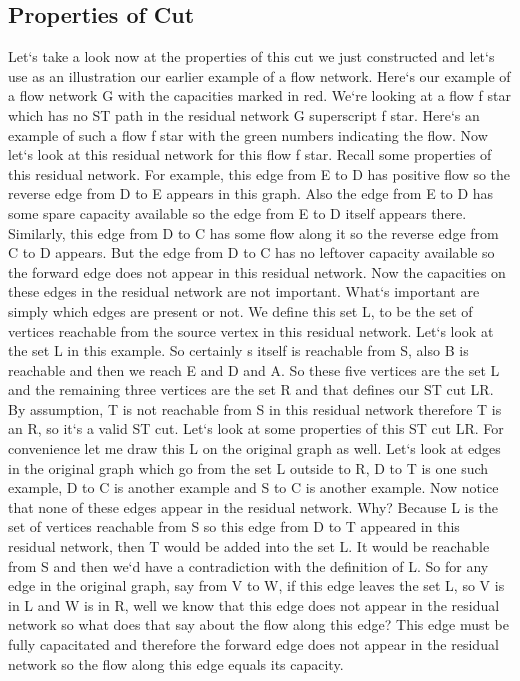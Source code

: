\subsection{Properties of Cut}
Let`s take a look now at the properties of this cut we just constructed and let`s use as an illustration our earlier example of a flow network.
Here`s our example of a flow network G with the capacities marked in red.
We`re looking at a flow f star which has no ST path in the residual network G superscript f star.
Here`s an example of such a flow f star with the green numbers indicating the flow.
Now let`s look at this residual network for this flow f star.
Recall some properties of this residual network.
For example, this edge from E to D has positive flow so the reverse edge from D to E appears in this graph.
Also the edge from E to D has some spare capacity available so the edge from E to D itself appears there.
Similarly, this edge from D to C has some flow along it so the reverse edge from C to D appears.
But the edge from D to C has no leftover capacity available so the forward edge does not appear in this residual network.
Now the capacities on these edges in the residual network are not important.
What`s important are simply which edges are present or not.
We define this set L, to be the set of vertices reachable from the source vertex in this residual network.
Let`s look at the set L in this example.
So certainly s itself is reachable from S, also B is reachable and then we reach E and D and A\@.
So these five vertices are the set L and the remaining three vertices are the set R and that defines our ST cut LR\@.
By assumption, T is not reachable from S in this residual network therefore T is an R, so it`s a valid ST cut.
Let`s look at some properties of this ST cut LR\@.
For convenience let me draw this L on the original graph as well.
Let`s look at edges in the original graph which go from the set L outside to R, D to T is one such example, D to C is another example and S to C is another example.
Now notice that none of these edges appear in the residual network.
Why? Because L is the set of vertices reachable from S so this edge from D to T appeared in this residual network, then T would be added into the set L\@.
It would be reachable from S and then we`d have a contradiction with the definition of L\@.
So for any edge in the original graph, say from V to W, if this edge leaves the set L, so V is in L and W is in R, well we know that this edge does not appear in the residual network so what does that say about the flow along this edge? This edge must be fully capacitated and therefore the forward edge does not appear in the residual network so the flow along this edge equals its capacity.
